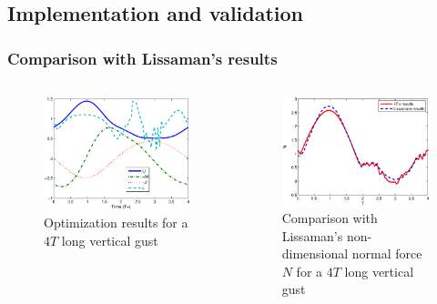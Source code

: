 \documentclass[compress]{beamer}
\begin{document}
\subsection{Implementation and validation}

\begin{frame}
  \frametitle{Comparison with Lissaman's results}
  \begin{columns}
    \begin{figure}[ht]
      \begin{center}	
	\includegraphics[width=1\textwidth]{./Figures/Windtype=1_Tg=4_Wg=0p129_quad_G=20.eps}
      \end{center}
      \caption{Optimization results for a $4T$ long vertical gust}
      \label{fig:Validation_optimization}
    \end{figure}
    \begin{figure}[h]
      \centering
      \includegraphics[width=1\textwidth]{./Figures/LIssaman_N_comparison.eps}
      \caption{Comparison with Lissaman's non-dimensional normal force $N$ for a $4T$ long vertical gust}
    \end{figure}
  \end{columns}
\end{frame}
\end{document}

